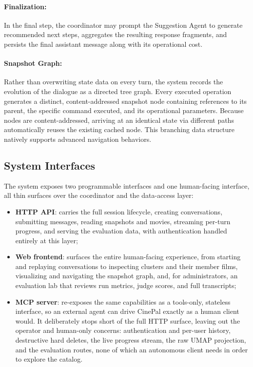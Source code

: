 \paragraph{Finalization:} In the final step, the coordinator may prompt the Suggestion Agent to generate recommended next steps, aggregates the resulting response fragments, and persists the final assistant message along with its operational cost.

\paragraph{Snapshot Graph:} Rather than overwriting state data on every turn, the system records the evolution of the dialogue as a directed tree graph.
Every executed operation generates a distinct, content-addressed snapshot node containing references to its parent, the specific command executed, and its operational parameters.
Because nodes are content-addressed, arriving at an identical state via different paths automatically reuses the existing cached node.
This branching data structure natively supports advanced navigation behaviors.

\subsection{System Interfaces}

The system exposes two programmable interfaces and one human-facing interface, all thin surfaces over the coordinator and the data-access layer:
\begin{itemize}[leftmargin=1.4em]
  \item \textbf{HTTP API}: carries the full session lifecycle, creating conversations, submitting messages, reading snapshots and movies, streaming per-turn progress, and serving the evaluation data, with authentication handled entirely at this layer;
  \item \textbf{Web frontend}: surfaces the entire human-facing experience, from starting and replaying conversations to inspecting clusters and their member films, visualizing and navigating the snapshot graph, and, for administrators, an evaluation lab that reviews run metrics, judge scores, and full transcripts;
  \item \textbf{MCP server}: re-exposes the same capabilities as a tools-only, stateless interface, so an external agent can drive CinePal exactly as a human client would.
  It deliberately stops short of the full HTTP surface, leaving out the operator and human-only concerns: authentication and per-user history, destructive hard deletes, the live progress stream, the raw UMAP projection, and the evaluation routes, none of which an autonomous client needs in order to explore the catalog.
\end{itemize}
